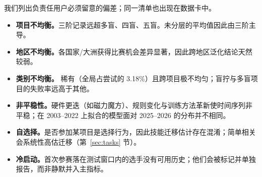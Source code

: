 我们列出负责任用户必须留意的偏差；同一清单也出现在数据卡中。
\begin{itemize}
  \item \textbf{项目不均衡。}三阶记录远超多盲、四盲、五盲。未分层的平均值因此由三阶主导。
  \item \textbf{地区不均衡。}各国家/大洲获得比赛机会差异显著，因此跨地区泛化结论天然较弱。
  \item \textbf{类别不均衡。}\DNF{} 稀有（全局占尝试的 3.18\%）且跨项目极不均匀；盲拧与多盲项目的失败率远高于其他。
  \item \textbf{非平稳性。}硬件更迭（如磁力魔方）、规则变化与训练方法革新使时间序列非平稳；在 2003--2022 上拟合的模型面对 2025--2026 的分布并不相同。
  \item \textbf{自选择。}是否参加某项目是选择行为，因此技能迁移估计存在混淆；简单相关会系统性高估迁移（第~\ref{sec:tasks} 节）。
  \item \textbf{冷启动。}首次参赛落在测试窗口内的选手没有可用历史；他们会被标记并单独报告，而非静默并入主指标。
\end{itemize}
